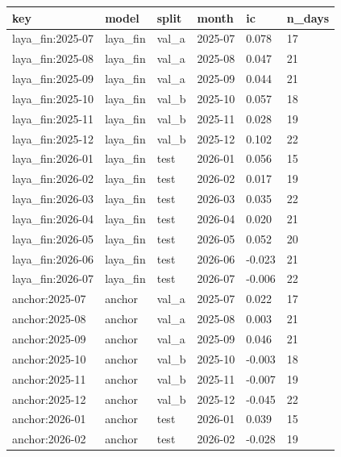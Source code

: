 \begin{tabular}{llllll}
\toprule
key & model & split & month & ic & n\_days \\
\midrule
laya\_fin:2025-07 & laya\_fin & val\_a & 2025-07 & 0.078 & 17 \\
laya\_fin:2025-08 & laya\_fin & val\_a & 2025-08 & 0.047 & 21 \\
laya\_fin:2025-09 & laya\_fin & val\_a & 2025-09 & 0.044 & 21 \\
laya\_fin:2025-10 & laya\_fin & val\_b & 2025-10 & 0.057 & 18 \\
laya\_fin:2025-11 & laya\_fin & val\_b & 2025-11 & 0.028 & 19 \\
laya\_fin:2025-12 & laya\_fin & val\_b & 2025-12 & 0.102 & 22 \\
laya\_fin:2026-01 & laya\_fin & test & 2026-01 & 0.056 & 15 \\
laya\_fin:2026-02 & laya\_fin & test & 2026-02 & 0.017 & 19 \\
laya\_fin:2026-03 & laya\_fin & test & 2026-03 & 0.035 & 22 \\
laya\_fin:2026-04 & laya\_fin & test & 2026-04 & 0.020 & 21 \\
laya\_fin:2026-05 & laya\_fin & test & 2026-05 & 0.052 & 20 \\
laya\_fin:2026-06 & laya\_fin & test & 2026-06 & -0.023 & 21 \\
laya\_fin:2026-07 & laya\_fin & test & 2026-07 & -0.006 & 22 \\
anchor:2025-07 & anchor & val\_a & 2025-07 & 0.022 & 17 \\
anchor:2025-08 & anchor & val\_a & 2025-08 & 0.003 & 21 \\
anchor:2025-09 & anchor & val\_a & 2025-09 & 0.046 & 21 \\
anchor:2025-10 & anchor & val\_b & 2025-10 & -0.003 & 18 \\
anchor:2025-11 & anchor & val\_b & 2025-11 & -0.007 & 19 \\
anchor:2025-12 & anchor & val\_b & 2025-12 & -0.045 & 22 \\
anchor:2026-01 & anchor & test & 2026-01 & 0.039 & 15 \\
anchor:2026-02 & anchor & test & 2026-02 & -0.028 & 19 \\

\end{tabular}
